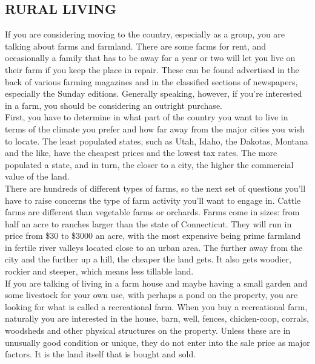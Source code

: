 \documentclass[11pt,twoside,a4paper]{book}
\begin{document}
\subsection{RURAL LIVING}

If you are considering moving to the country, especially as a group, you are talking about farms and farmland. There are some farms for rent, and occasionally a family that has to be away for a year or two will let you live on their farm if you keep the place in repair. These can be found advertised in the back of various farming magazines and in the classified sections of newspapers, especially the Sunday editions. Generally speaking, however, if you're interested in a farm, you should be considering an outright purchase.~\\

First, you have to determine in what part of the country you want to live in terms of the climate you prefer and how far away from the major cities you wish to locate. The least populated states, such as Utah, Idaho, the Dakotas, Montana and the like, have the cheapest prices and the lowest tax rates. The more populated a state, and in turn, the closer to a city, the higher the commercial value of the land.~\\

There are hundreds of different types of farms, so the next set of questions you'll have to raise concerns the type of farm activity you'll want to engage in. Cattle farms are different than vegetable farms or orchards. Farms come in sizes: from half an acre to ranches larger than the state of Connecticut. They will run in price from \$30 to \$3000 an acre, with the most expensive being prime farmland in fertile river valleys located close to an urban area. The further away from the city and the further up a hill, the cheaper the land gets. It also gets woodier, rockier and steeper, which means less tillable land.~\\

If you are talking of living in a farm house and maybe having a small garden and some livestock for your own use, with perhaps a pond on the property, you are looking for what is called a recreational farm. When you buy a recreational farm, naturally you are interested in the house, barn, well, fences, chicken-coop, corrals, woodsheds and other physical structures on the property. Unless these are in unusually good condition or unique, they do not enter into the sale price as major factors. It is the land itself that is bought and sold.~\\
\end{document}

